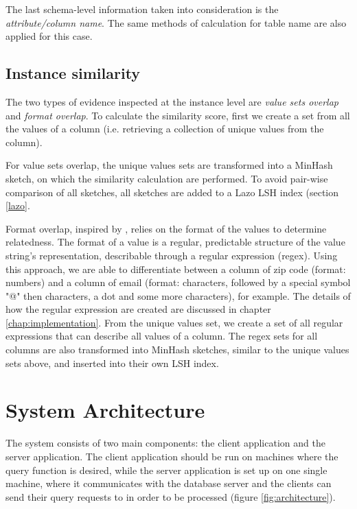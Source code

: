 The last schema-level information taken into consideration is the \textit{attribute/column name}. The same methods of calculation for table name are also applied for this case.

\subsection{Instance similarity}

The two types of evidence inspected at the instance level are \textit{value sets overlap} and \textit{format overlap}. To calculate the similarity score, first we create a set from all the values of a column (i.e. retrieving a collection of unique values from the column).

For value sets overlap, the unique values sets are transformed into a MinHash sketch, on which the similarity calculation are performed. To avoid pair-wise comparison of all sketches, all sketches are added to a Lazo LSH index (section \ref{lazo}.

Format overlap, inspired by \cite{d3l}, relies on the format of the values to determine relatedness. The format of a value is a regular, predictable structure of the value string's representation, describable through a regular expression (regex). Using this approach, we are able to differentiate between a column of zip code (format: numbers) and a column of email (format: characters, followed by a special symbol "@" then characters, a dot and some more characters), for example. The details of how the regular expression are created are discussed in chapter \ref{chap:implementation}. From the unique values set, we create a set of all regular expressions that can describe all values of a column. The regex sets for all columns are also transformed into MinHash sketches, similar to the unique values sets above, and inserted into their own LSH index.

\section{System Architecture}

The system consists of two main components: the client application and the server application. The client application should be run on machines where the query function is desired, while the server application is set up on one single machine, where it communicates with the database server and the clients can send their query requests to in order to be processed (figure \ref{fig:architecture}).

